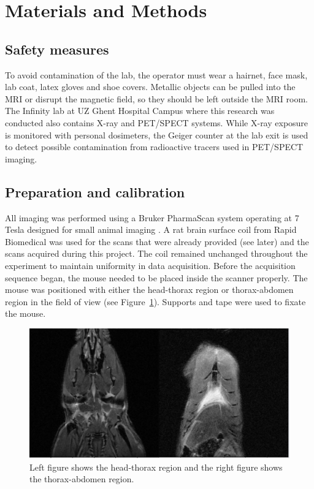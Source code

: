 \documentclass[twocolumn]{article}
\begin{document}
\twocolumn
\section{Materials and Methods}
\subsection{Safety measures}

To avoid contamination of the lab, the operator must wear a hairnet, face mask, lab coat, latex gloves and shoe covers. 
Metallic objects can be pulled into the MRI or disrupt the magnetic field, so they should be left outside the MRI room. 
The Infinity lab at UZ Ghent Hospital Campus where this research was conducted also contains X-ray and PET/SPECT systems. 
While X-ray exposure is monitored with personal dosimeters, the Geiger counter at the lab exit is used to detect possible contamination from radioactive tracers used in PET/SPECT imaging.

\subsection{Preparation and calibration }

All imaging was performed using a Bruker PharmaScan system operating at 7 Tesla designed for small animal imaging \cite{bruker2025pharmascan}. 
A rat brain surface coil from Rapid Biomedical was used for the scans that were already provided (see later) and the scans acquired during this project. 
The coil remained unchanged throughout the experiment to maintain uniformity in data acquisition.
Before the acquisition sequence began, the mouse needed to be placed inside the scanner properly. 
The mouse was positioned with either the head-thorax region or thorax-abdomen region in the field of view (see Figure~\ref{fig:head-thorax}). 
Supports and tape were used to fixate the mouse. 

\begin{figure}[H]
    \centering
    \includegraphics[width=0.95\linewidth]{head-thorax.png}
    \caption{Left figure shows the head-thorax region and the right figure shows the thorax-abdomen region.}
    \label{fig:head-thorax}
\end{figure}
\end{document}
